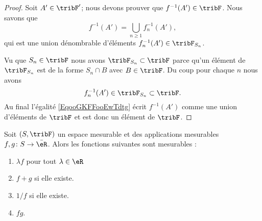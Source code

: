 \begin{proof}
    Soit \( A'\in\tribF'\); nous devons prouver que \( f^{-1}(A')\in \tribF\). Nous savons que 
    \begin{equation}        \label{EqooGKFFooEwTdtg}
        f^{-1}(A')=\bigcup_{n\geq 1}f_n^{-1}(A'),
    \end{equation}
    qui est une union dénombrable d'éléments \( f_n^{-1}(A')\in\tribF_{S_n}\). 

    Vu que \( S_n\in \tribF\) nous avons \( \tribF_{S_n}\subset\tribF\) parce qu'un élément de \( \tribF_{S_n}\) est de la forme \( S_n\cap B\) avec \( B\in\tribF\). Du coup pour chaque \( n\) nous avons
    \begin{equation}
        f_n^{-1}(A')\in\tribF_{S_n}\subset \tribF.
    \end{equation}
    Au final l'égalité \eqref{EqooGKFFooEwTdtg} écrit \( f^{-1}(A')\) comme une union d'éléments de \( \tribF\) et est donc un élément de \( \tribF\).
\end{proof}

\begin{proposition}     \label{PROPooODDVooEEmmTX}
    Soit \( (S,\tribF)\) un espace mesurable et des applications mesurables \( f,g\colon S\to \bar \eR\). Alors les fonctions suivantes sont mesurables :
    \begin{enumerate}
        \item
            \( \lambda f\) pour tout \( \lambda\in \eR\)
        \item
            \( f+g\) si elle existe.
        \item
            \( 1/f\) si elle existe.
        \item
            \( fg\).
    \end{enumerate}
\end{proposition}

